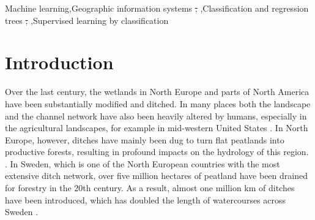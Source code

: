 \documentclass[11pt, review]{elsarticle} %
\providecommand{\DIFdeltex}[1]{{\protect\color{red}\sout{#1}}}                      %
\providecommand{\DIFaddbegin}{} %
\providecommand{\DIFaddend}{} %
\providecommand{\DIFdelbegin}{} %
\providecommand{\DIFdelend}{} %
\providecommand{\DIFdel}[1]{\texorpdfstring{\DIFdeltex{#1}}{}} %
\begin{document}
\begin{frontmatter}
\DIFdelbegin %
\DIFaddbegin \begin{keyword}
{\footnotesize
Machine learning\sep Geographic information systems \DIFdelbegin \DIFdel{; }\DIFdelend \DIFaddbegin \sep \DIFaddend Classification and regression trees \DIFdelbegin \DIFdel{; }\DIFdelend \DIFaddbegin \sep \DIFaddend Supervised learning by classification\DIFdelbegin %
\DIFdelend \DIFaddbegin }
\end{keyword}
\DIFaddend 

\DIFaddbegin \end{frontmatter}

\newpage
\DIFaddend \section{Introduction}\label{introduction}

Over the last century, the wetlands in North Europe and parts of North America have been substantially modified and ditched. In many places both the landscape and the channel network have also been heavily altered  by humans, especially in the agricultural landscapes, for example in mid-western United States \citep{passalacqua}. In North Europe, however, ditches have mainly been dug to turn flat peatlands into productive forests, resulting in profound impacts on the hydrology of this region. \citep{peatlands}. In Sweden, which is one of the North European countries with the most extensive ditch network, over five million hectares of peatland have been drained for forestry in the 20th century.  As a result, almost one million km of ditches have been introduced, which has doubled the length of watercourses across Sweden  \citep{hasselquist}.
\end{document}
